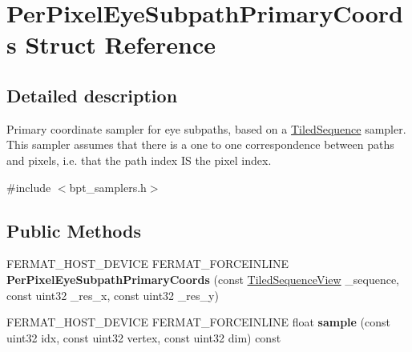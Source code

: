 \hypertarget{struct_per_pixel_eye_subpath_primary_coords}{}\section{Per\+Pixel\+Eye\+Subpath\+Primary\+Coords Struct Reference}
\label{struct_per_pixel_eye_subpath_primary_coords}


\subsection{Detailed description}
Primary coordinate sampler for eye subpaths, based on a \hyperlink{struct_tiled_sequence}{Tiled\+Sequence} sampler. This sampler assumes that there is a one to one correspondence between paths and pixels, i.\+e. that the path index IS the pixel index. 

{\ttfamily \#include $<$bpt\+\_\+samplers.\+h$>$}

\subsection*{Public Methods}
\begin{DoxyCompactItemize}
\item 
\mbox{\label{struct_per_pixel_eye_subpath_primary_coords_a0680b91cb249feac14bac477c601f000}} 
F\+E\+R\+M\+A\+T\+\_\+\+H\+O\+S\+T\+\_\+\+D\+E\+V\+I\+CE F\+E\+R\+M\+A\+T\+\_\+\+F\+O\+R\+C\+E\+I\+N\+L\+I\+NE {\bfseries Per\+Pixel\+Eye\+Subpath\+Primary\+Coords} (const \hyperlink{struct_tiled_sequence_view}{Tiled\+Sequence\+View} \+\_\+sequence, const uint32 \+\_\+res\+\_\+x, const uint32 \+\_\+res\+\_\+y)
\item 
\mbox{\label{struct_per_pixel_eye_subpath_primary_coords_a149efc72191a13e0d1cefb81396173a4}} 
F\+E\+R\+M\+A\+T\+\_\+\+H\+O\+S\+T\+\_\+\+D\+E\+V\+I\+CE F\+E\+R\+M\+A\+T\+\_\+\+F\+O\+R\+C\+E\+I\+N\+L\+I\+NE float {\bfseries sample} (const uint32 idx, const uint32 vertex, const uint32 dim) const
\end{DoxyCompactItemize}
